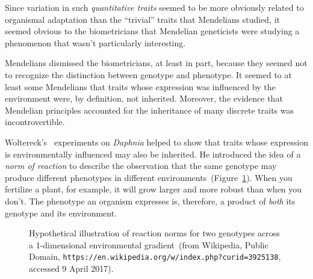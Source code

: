 \documentclass[12pt]{article}
\begin{document}
\noindent Since variation in such {\it quantitative traits\/} seemed
to be more obviously related to organismal adaptation than the
``trivial'' traits that Mendelians studied, it seemed obvious to the
biometricians that Mendelian geneticists were studying a phenomenon
that wasn't particularly interesting.

Mendelians dismissed the biometricians, at least in part, because they
seemed not to recognize the distinction between genotype and
phenotype. It seemed to at least some Mendelians that traits whose
expression was influenced by the environment were, by definition, not
inherited. Moreover, the evidence that Mendelian principles accounted
for the inheritance of many discrete traits was incontrovertible.

Woltereck's~\cite{Woltereck-1909} experiments on {\it Daphnia\/}
helped to show that traits whose expression is environmentally
influenced may also be inherited. He introduced the idea of a {\it
  norm of reaction} to describe the observation that the same genotype
may produce different phenotypes in different
environments~(Figure~\ref{fig:norm-of-reaction}). When you fertilize a
plant, for example, it will grow larger and more robust than when you
don't. The phenotype an organism expresses is, therefore, a product of
{\it both\/} its genotype and its environment.

\begin{figure}
\begin{center}
\end{center}
\caption{Hypothetical illustration of reaction norms for two genotypes
  across a 1-dimensional environmental gradient~(from Wikipedia,
  Public Domain,
  {\tt https://en.wikipedia.org/w/index.php?curid=3925138}, accessed 9
  April 2017).}\label{fig:norm-of-reaction}
\end{figure}
\end{document}
